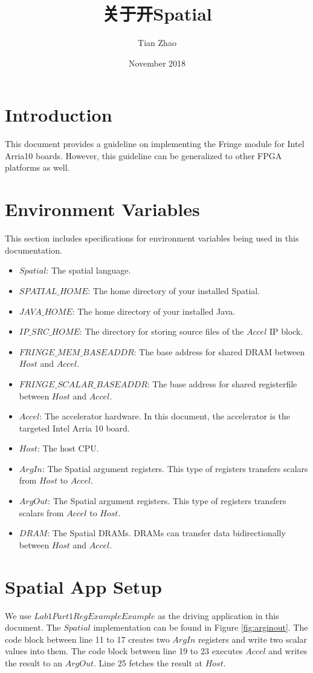 \documentclass{article}
\title{关于开Spatial}
\author{Tian Zhao}
\date{November 2018}
\begin{document}
    
    \maketitle
    
    \section{Introduction}
    This document provides a guideline on implementing the Fringe module for Intel Arria10 boards.
    However, this guideline can be generalized to other FPGA platforms as well.
    
    \section{Environment Variables}
    This section includes specifications for environment variables being used in this documentation.
    \begin{itemize}
        \item $Spatial$: The spatial language.
        \item $SPATIAL\_HOME$: The home directory of your installed Spatial.
        \item $JAVA\_HOME$: The home directory of your installed Java.
        \item $IP\_SRC\_HOME$: The directory for storing source files of the $Accel$ IP block.
        \item $FRINGE\_MEM\_BASEADDR$: The base address for shared DRAM between $Host$ and $Accel$.
        \item $FRINGE\_SCALAR\_BASEADDR$: The base address for shared registerfile between $Host$ and $Accel$.
        \item $Accel$: The accelerator hardware. In this document, the accelerator is the targeted Intel Arria 10 board.
        \item $Host$: The host CPU.
        \item $ArgIn$: The Spatial argument registers. This type of registers transfers scalars from $Host$ to $Accel$.
        \item $ArgOut$: The Spatial argument registers. This type of registers transfers scalars from $Accel$ to $Host$.
        \item $DRAM$: The Spatial DRAMs. DRAMs can transfer data bidirectionally between $Host$ and $Accel$.
    \end{itemize}
    
    \section{Spatial App Setup}
    We use $Lab1Part1RegExampleExample$ as the driving application in this document.
    The $Spatial$ implementation can be found in Figure \ref{fig:arginout}.
    The code block between line 11 to 17 creates two $ArgIn$ registers and write two scalar values into them.
    The code block between line 19 to 23 executes $Accel$ and writes the result to an $ArgOut$.
    Line 25 fetches the result at $Host$.
    
\end{document}
